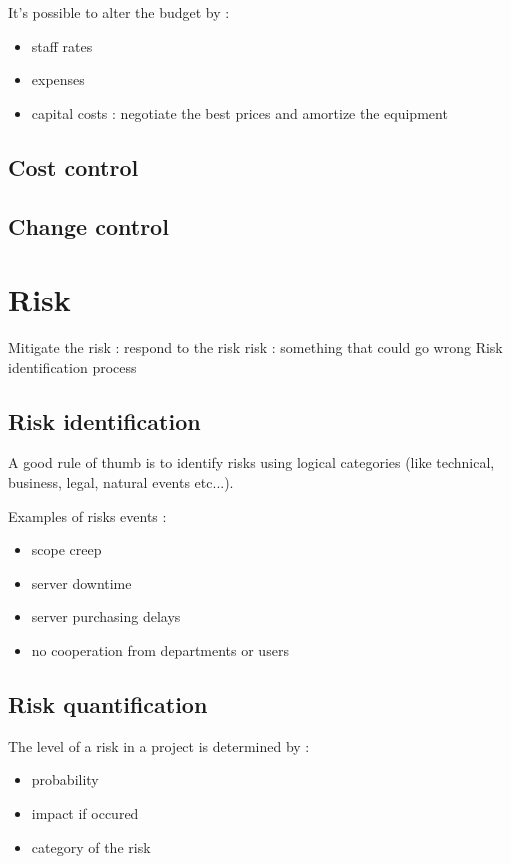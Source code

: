 \documentclass{article}
\begin{document}
It's possible to alter the budget by :
\begin{itemize}
	\item staff rates
	\item expenses
	\item capital costs : negotiate the best prices and amortize the equipment
\end{itemize}



\subsection{Cost control}
\subsection{Change control}

\section{Risk}
Mitigate the risk : respond to the risk
risk : something that could go wrong
\newline
Risk identification process
\subsection{Risk identification}
A good rule of thumb is to identify risks using logical categories (like technical, business, legal, natural events etc...).\newline

Examples of risks events :
\begin{itemize}
	\item scope creep
	\item server downtime
	\item server purchasing delays
	\item no cooperation from departments or users
\end{itemize}



\subsection{Risk quantification}
The level of a risk in a project is determined by :
\begin{itemize}
	\item probability
	\item impact if occured
	\item category of the risk
\end{itemize}
\end{document}
